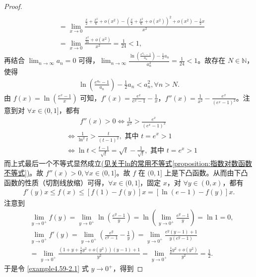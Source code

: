 \documentclass[../../main.tex]{subfiles}%
\begin{document}
\begin{proof}
\begin{align*}
\\
&=\lim_{x\rightarrow 0} \frac{\frac{x}{2}+\frac{x^2}{6}+o(x^2)-\left( \frac{x}{2}+\frac{x^2}{6}+o(x^2) \right) ^2+o(x^2)-\frac{1}{2}x}{x^2}
\\
&=\lim_{x\rightarrow 0} \frac{\frac{x^2}{24}+o(x^2)}{x^2}=\frac{1}{24}<1,
\end{align*}
再结合 \(\lim_{n \to \infty} a_n = 0\) 可得，\(\lim_{n \to \infty} \frac{\ln\left(\frac{e^{a_n} - 1}{a_n}\right) - \frac{1}{2} a_n}{a_n^2} = \frac{1}{24} < 1\)。故存在 \(N \in \mathbb{N}\)，使得
\begin{align}
\ln\left(\frac{e^{a_n} - 1}{a_n}\right) - \frac{1}{2} a_n < a_n^2,\forall n > N. \label{example4.59-3.1}
\end{align}
由 \(f(x)=\ln\left(\frac{e^x - 1}{x}\right)\) 可知，\(f'(x)=\frac{e^x}{e^x - 1} - \frac{1}{x}\)，\(f''(x)=\frac{1}{x^2} - \frac{e^x}{(e^x - 1)^2}\)。注意到对 \(\forall x \in (0, 1]\)，都有
\begin{align*}
& \quad \quad f''(x) > 0 \Leftrightarrow \frac{1}{x^2} > \frac{e^x}{(e^x - 1)^2}\\
&\Leftrightarrow \frac{1}{\ln^2 t} > \frac{t}{(t - 1)^2},\text{ 其中 }t = e^x > 1\\
&\Leftrightarrow \ln t < \frac{t - 1}{\sqrt{t}} = \sqrt{t} - \frac{1}{\sqrt{t}},\text{ 其中 }t = e^x > 1
\end{align*}
而上式最后一个不等式显然成立\hyperref[proposition:指数对数函数不等式]{(见关于ln的常用不等式\ref{proposition:指数对数函数不等式})}。故 \(f''(x) > 0,\forall x \in (0, 1]\)。故 \(f\) 在 \((0, 1]\) 上是下凸函数。从而由下凸函数的性质（切割线放缩）可得，\(\forall x \in (0, 1]\)，固定 \(x\)，对 \(\forall y \in (0, x)\)，都有
\begin{align}
f'(y) x \leqslant  f(x) \leqslant  [f(1) - f(y)] x = [\ln(e - 1) - f(y)] x. \label{example4.59-2.1}
\end{align}
注意到
\begin{align*}
&\lim_{y \to 0^+} f(y) = \lim_{y \to 0^+} \ln\left(\frac{e^y - 1}{y}\right) = \ln\left(\lim_{y \to 0^+} \frac{e^y - 1}{y}\right) = \ln 1 = 0,\\
&\lim_{y \to 0^+} f'(y) = \lim_{y \to 0^+} \left(\frac{e^y}{e^y - 1} - \frac{1}{y}\right) = \lim_{y \to 0^+} \frac{e^y(y - 1) + 1}{y(e^y - 1)}\\
&= \lim_{y \to 0^+} \frac{(1 + y + \frac{1}{2} y^2 + o(y^2))(y - 1) + 1}{y^2} = \lim_{y \to 0^+} \frac{\frac{1}{2} y^2 + o(y^2)}{y^2} = \frac{1}{2}.
\end{align*}
于是令 \eqref{example4.59-2.1} 式 \(y \to 0^+\)，得到

\end{proof}
\end{document}
